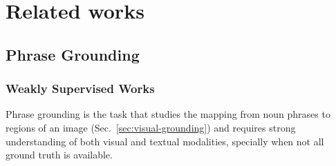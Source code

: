 
\chapter{Related works}

\section{Phrase Grounding}

\subsection{Weakly Supervised Works}

Phrase grounding is the task that studies the mapping from noun
phrases to regions of an image (Sec.~\ref{sec:visual-grounding}) and
requires strong understanding of both visual and textual modalities,
specially when not all ground truth is available. 

